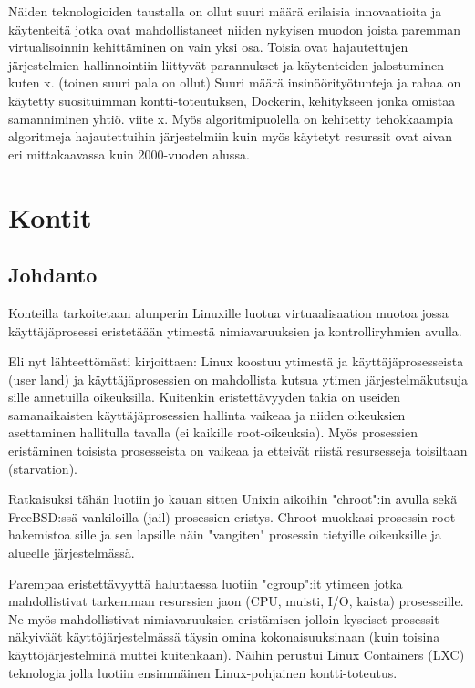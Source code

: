 \documentclass[finnish]{tktltiki2}
\theoremstyle{definition}
\theoremstyle{remark}
\begin{document}
Näiden teknologioiden taustalla on ollut suuri määrä erilaisia innovaatioita ja käytenteitä jotka ovat mahdollistaneet niiden nykyisen muodon joista paremman virtualisoinnin kehittäminen on vain yksi osa. Toisia ovat hajautettujen järjestelmien hallinnointiin liittyvät parannukset ja käytenteiden jalostuminen kuten x. (toinen suuri pala on ollut) Suuri määrä insinöörityötunteja ja rahaa on käytetty suosituimman kontti-toteutuksen, Dockerin, kehitykseen jonka omistaa samanniminen yhtiö. viite x. Myös algoritmipuolella on kehitetty tehokkaampia algoritmeja hajautettuihin järjestelmiin kuin myös käytetyt resurssit ovat aivan eri mittakaavassa kuin 2000-vuoden alussa.

\section{Kontit}

\subsection{Johdanto}

Konteilla tarkoitetaan alunperin Linuxille luotua virtuaalisaation muotoa jossa käyttäjäprosessi eristetäään ytimestä nimiavaruuksien ja kontrolliryhmien avulla.

Eli nyt lähteettömästi kirjoittaen: Linux koostuu ytimestä ja käyttäjäprosesseista (user land) ja käyttäjäprosessien on mahdollista kutsua ytimen järjestelmäkutsuja sille annetuilla oikeuksilla. Kuitenkin eristettävyyden takia on useiden samanaikaisten käyttäjäprosessien hallinta vaikeaa ja niiden oikeuksien asettaminen hallitulla tavalla (ei kaikille root-oikeuksia). Myös prosessien eristäminen toisista prosesseista on vaikeaa ja etteivät riistä resursesseja toisiltaan (starvation).

Ratkaisuksi tähän luotiin jo kauan sitten Unixin aikoihin "chroot":in avulla sekä FreeBSD:ssä vankiloilla (jail) prosessien eristys. Chroot muokkasi prosessin root-hakemistoa sille ja sen lapsille näin "vangiten" prosessin tietyille oikeuksille ja alueelle järjestelmässä.

Parempaa eristettävyyttä haluttaessa luotiin "cgroup":it ytimeen jotka mahdollistivat tarkemman resurssien jaon (CPU, muisti, I/O, kaista) prosesseille. Ne myös mahdollistivat nimiavaruuksien eristämisen jolloin kyseiset prosessit näkyiväät käyttöjärjestelmässä täysin omina kokonaisuuksinaan (kuin toisina käyttöjärjestelminä muttei kuitenkaan). Näihin perustui Linux Containers (LXC) teknologia jolla luotiin ensimmäinen Linux-pohjainen kontti-toteutus.
\end{document}
